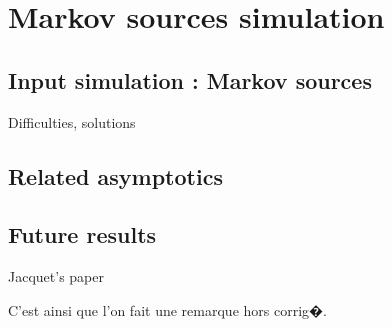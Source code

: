 \section{Markov sources simulation}
    \subsection{Input simulation : Markov sources}
        Difficulties, solutions
    \subsection{Related asymptotics}
    \subsection{Future results}
        Jacquet's paper 



\begin{remarque}

\noindent C'est ainsi que l'on fait une remarque hors corrig�.

\end{remarque}


